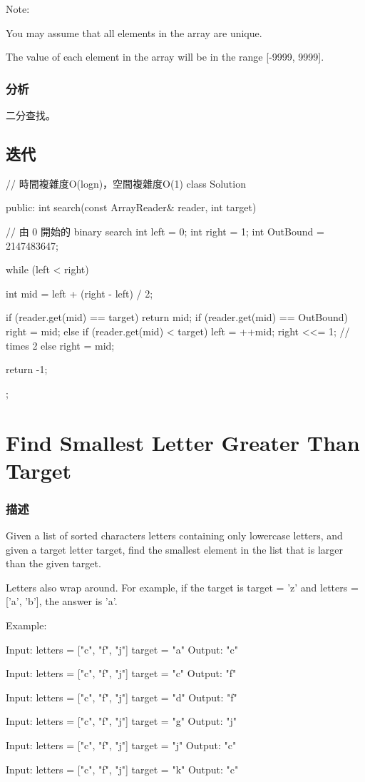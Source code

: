 Note:
\begindot
\item You may assume that all elements in the array are unique.
\item The value of each element in the array will be in the range [-9999, 9999].
\myenddot


\subsubsection{分析}
二分查找。


\subsection{迭代}
\begin{Code}
// 時間複雜度O(logn)，空間複雜度O(1)
class Solution {
public:
    int search(const ArrayReader& reader, int target) {
        // 由 0 開始的 binary search
        int left = 0;
        int right = 1;
        int OutBound = 2147483647;

        while (left < right) {
            int mid = left + (right - left) / 2;

            if (reader.get(mid) == target) return mid;
            if (reader.get(mid) == OutBound)
                right = mid;
            else if (reader.get(mid) < target) {
                left = ++mid;
                right <<= 1; // times 2
            }
            else
                right = mid;
        }

        return -1;
    }
};
\end{Code}


\section{Find Smallest Letter Greater Than Target} %
\label{sec:find-smallest-letter-greater-than-target}


\subsubsection{描述}
Given a list of sorted characters letters containing only lowercase letters, and given a target letter target, find the smallest element in the list that is larger than the given target.

Letters also wrap around. For example, if the target is target = 'z' and letters = ['a', 'b'], the answer is 'a'.


Example:
\begin{Code}
Input:
letters = ["c", "f", "j"]
target = "a"
Output: "c"

Input:
letters = ["c", "f", "j"]
target = "c"
Output: "f"

Input:
letters = ["c", "f", "j"]
target = "d"
Output: "f"

Input:
letters = ["c", "f", "j"]
target = "g"
Output: "j"

Input:
letters = ["c", "f", "j"]
target = "j"
Output: "c"

Input:
letters = ["c", "f", "j"]
target = "k"
Output: "c"
\end{Code}

